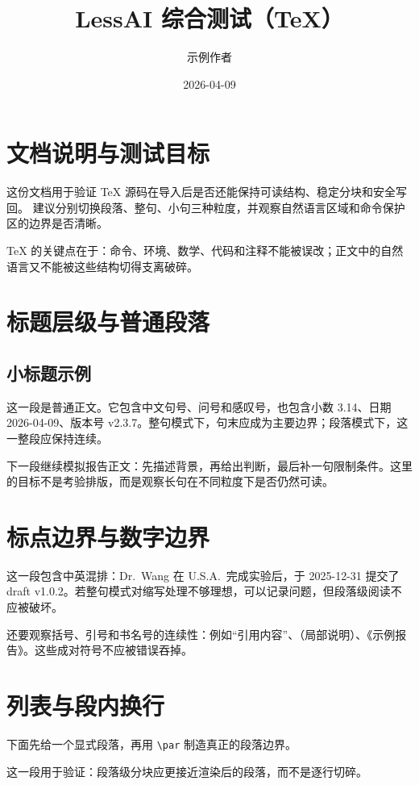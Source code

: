 \documentclass[a4paper,11pt]{article}
\title{LessAI 综合测试（TeX）}
\author{示例作者}
\date{2026-04-09}
\begin{document}
\maketitle
\tableofcontents

\section{文档说明与测试目标}

这份文档用于验证 TeX 源码在导入后是否还能保持可读结构、稳定分块和安全写回。
建议分别切换段落、整句、小句三种粒度，并观察自然语言区域和命令保护区的边界是否清晰。

TeX 的关键点在于：命令、环境、数学、代码和注释不能被误改；正文中的自然语言又不能被这些结构切得支离破碎。

\section{标题层级与普通段落}

\subsection{小标题示例}

这一段是普通正文。它包含中文句号、问号和感叹号，也包含小数 3.14、日期 2026-04-09、版本号 v2.3.7。整句模式下，句末应成为主要边界；段落模式下，这一整段应保持连续。

下一段继续模拟报告正文：先描述背景，再给出判断，最后补一句限制条件。这里的目标不是考验排版，而是观察长句在不同粒度下是否仍然可读。

\section{标点边界与数字边界}

这一段包含中英混排：Dr.\ Wang 在 U.S.A.\ 完成实验后，于 2025-12-31 提交了 draft v1.0.2。若整句模式对缩写处理不够理想，可以记录问题，但段落级阅读不应被破坏。

还要观察括号、引号和书名号的连续性：例如“引用内容”、（局部说明）、《示例报告》。这些成对符号不应被错误吞掉。

\section{列表与段内换行}

下面先给一个显式段落，再用 \texttt{\textbackslash par} 制造真正的段落边界。
\par
这一段用于验证：段落级分块应更接近渲染后的段落，而不是逐行切碎。
\end{document}

